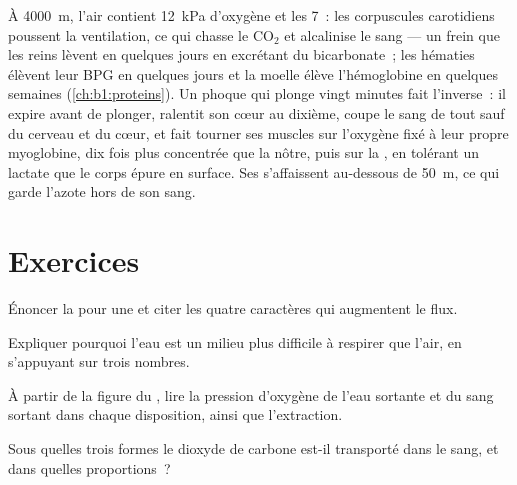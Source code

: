 \begin{example}\label{ex:b1:gas-exchange:altitudediving}
À \qty{4000}{m}, l'air contient \qty{12}{kPa} d'oxygène et les
 \qty{7}{}~: les corpuscules carotidiens poussent la
ventilation, ce qui chasse le $\mathrm{CO_2}$ et alcalinise le sang ---
un frein que les reins lèvent en quelques jours en excrétant du
bicarbonate~; les hématies élèvent leur BPG en quelques jours et la
moelle élève l'hémoglobine en quelques semaines
(\cref{ch:b1:proteins}). Un phoque qui plonge vingt minutes fait
l'inverse~: il expire avant de plonger, ralentit son cœur au dixième,
coupe le sang de tout sauf du cerveau et du cœur, et fait tourner ses
muscles sur l'oxygène fixé à leur propre myoglobine, dix fois plus
concentrée que la nôtre, puis sur la , en tolérant un
lactate que le corps épure en surface. Ses  s'affaissent
au-dessous de \qty{50}{m}, ce qui garde l'azote hors de son sang.
\end{example}

\section{Exercices}

\begin{exercise}[$\star$]\label{exo:b1:gas-exchange:1}
Énoncer la  pour une  et citer les quatre
caractères qui augmentent le flux.
\end{exercise}

\begin{exercise}[$\star$]\label{exo:b1:gas-exchange:2}
Expliquer pourquoi l'eau est un milieu plus difficile à respirer que
l'air, en s'appuyant sur trois nombres.
\end{exercise}

\begin{exercise}[$\star$]\label{exo:b1:gas-exchange:3}
À partir de la figure du , lire la pression d'oxygène de
l'eau sortante et du sang sortant dans chaque disposition, ainsi que
l'extraction.
\end{exercise}

\begin{exercise}[$\star$]\label{exo:b1:gas-exchange:4}
Sous quelles trois formes le dioxyde de carbone est-il transporté dans
le sang, et dans quelles proportions~?
\end{exercise}

